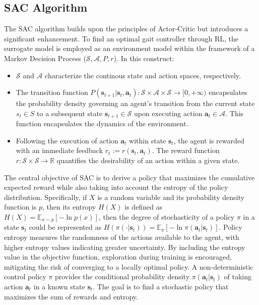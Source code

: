 \subsection{SAC Algorithm}
The \ac{SAC} algorithm builds upon the principles of Actor-Critic but introduces a significant enhancement. To find an optimal gait controller through RL, the surrogate model is employed as an environment model within the framework of a Markov Decision Process ($\mathcal{S}, \mathcal{A}, P, r$). In this construct:
\begin{itemize} 
    \item $\mathcal{S}$ and $\mathcal{A}$ characterize the continous state and action spaces, respectively.
    \item The transition function $P(\mathbf{s}_{t+1} | \mathbf{s}_t, \mathbf{a}_t): \mathcal{S} \times \mathcal{A} \times \mathcal{S} \rightarrow [0,+\infty)$ encapsulates the probability density governing an agent's transition from the current state $s_t \in S$ to a subsequent state $\mathbf{s}_{t+1} \in \mathcal{S}$ upon executing action $\mathbf{a}_t \in \mathcal{A}$. This function encapsulates the dynamics of the environment.
    \item Following the execution of action $\mathbf{a}_t$ within state $\mathbf{s}_t$, the agent is rewarded with an immediate feedback $r_t := r(\mathbf{s}_t, \mathbf{a}_t)$. The reward function $r: \mathcal{S} \times \mathcal{S} \to \mathbb{R}$ quantifies the desirability of an action within a given state.
\end{itemize}

The central objective of SAC is to derive a policy that maximizes the cumulative expected reward while also taking into account the entropy of the policy distribution. Specifically, if $X$ is a random variable and its probability density function is $p$, then its entropy $H(X)$ is defined as $H(X) = \mathbb{E}_{x\sim p}[-\ln p(x)]$, then the degree of stochasticity of a policy $\pi$ in a state $\mathbf{s}_t$ could be represented as $H(\pi(\cdot|\mathbf{s}_t)) = \mathbb{E}_\pi[-\ln \pi(\mathbf{a}_t|\mathbf{s}_t)]$. Policy entropy measures the randomness of the actions available to the agent, with higher entropy values indicating greater uncertainty. By including the entropy value in the objective function, exploration during training is encouraged, mitigating the risk of converging to a locally optimal policy. A non-deterministic control policy $\pi$ provides the conditional probability density $\pi(\mathbf{a}_t|\mathbf{s}_t)$ of taking action $\mathbf{a}_t$ in a known state $\mathbf{s}_t$. The goal is to find a stochastic policy that maximizes the sum of rewards and entropy. 

